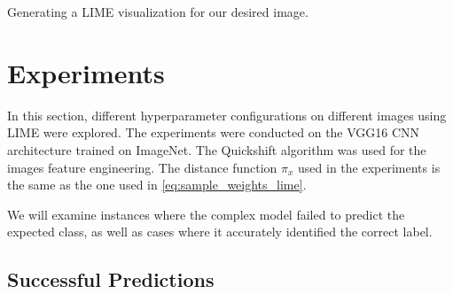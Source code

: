 Generating a LIME visualization for our desired image.

\newpage
\section{Experiments} 

In this section, different hyperparameter configurations on different images using LIME were explored.
The experiments were conducted on the VGG16 CNN architecture trained on ImageNet. 
The Quickshift algorithm was used for the images feature engineering. 
The distance function \(\pi_x\) used in the experiments is the same as the one used in \ref{eq:sample_weights_lime}.

We will examine instances where the complex model failed to predict the expected class, as well as cases where it accurately identified the correct label.

\subsection{Successful Predictions}

